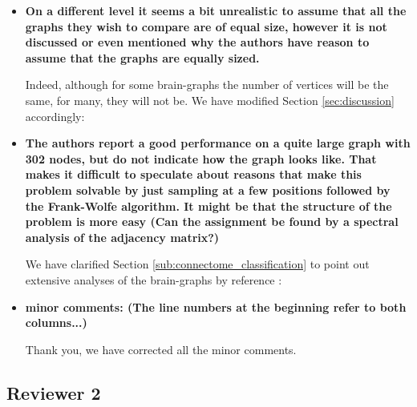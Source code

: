 \begin{itemize}
	\item \textbf{On a different level it seems a bit unrealistic to assume that all the
graphs they wish to compare are of equal size, however
it is not discussed or even mentioned why the authors have
reason to assume that the graphs are equally sized.}


Indeed, although for some brain-graphs the number of vertices will be the same, for many, they will not be.  We have modified Section \ref{sec:discussion} accordingly:


	\item \textbf{The authors report a good performance on a quite large graph with
302 nodes, but do not indicate how the graph looks like. That
makes it difficult to speculate about reasons that make this problem
solvable by just sampling at a few positions followed by the Frank-Wolfe
algorithm. It might be that the structure of the problem is
more easy (Can the assignment be found by a spectral analysis of the
adjacency matrix?)
}

We have clarified Section \ref{sub:connectome_classification} to point out extensive analyses of the brain-graphs by reference \cite{Varshney2011}:

		

	\item \textbf{minor comments: (The line numbers at the beginning refer to both columns...)
}

Thank you, we have corrected all the minor comments.

\end{itemize}


\newpage
\subsection*{Reviewer 2}
\label{sec:reviewer_2}

